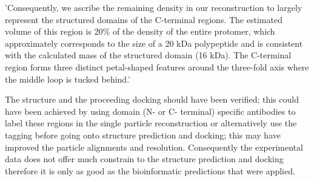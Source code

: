 'Consequently, we ascribe the remaining density in our reconstruction to largely represent the structured domains of the C-terminal regions. The estimated volume of this region is 20\% of the density of the entire protomer, which approximately corresponds to the size of a 20 kDa polypeptide and is consistent with the calculated mass of the structured domain (16 kDa). The C-terminal region forms three distinct petal-shaped features around the three-fold axis where the middle loop is tucked behind.'

The structure and the proceeding docking should have been verified; this could have been achieved by using domain (N- or C- terminal) specific antibodies to label these regions in the single particle reconstruction or alternatively use the tagging before going onto structure prediction and docking; this may have improved the particle alignments and resolution. Consequently the experimental data does not offer much constrain to the structure prediction and docking therefore it is only as good as the bioinformatic predictions that were applied.

